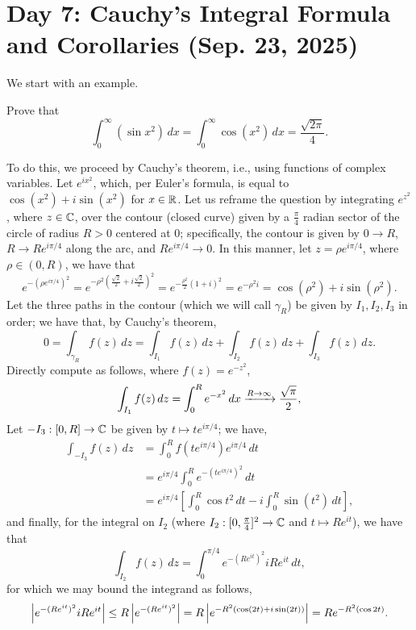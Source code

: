 \section{Day 7: Cauchy's Integral Formula and Corollaries (Sep. 23, 2025)}
We start with an example.
\begin{example}
    Prove that
    \[ \int_0^\infty (\sin x^2) \, dx = \int_0^\infty \cos(x^2) \, dx = \frac{\sqrt{2\pi}}{4}. \]
\end{example}
\begin{solution}
    To do this, we proceed by Cauchy's theorem, i.e., using functions of complex variables. Let $e^{ix^2}$, which, per Euler's formula, is equal to $\cos(x^2) + i \sin(x^2)$ for $x \in \mathbb R$. Let us reframe the question by integrating $e^{z^2}$, where $z \in \mathbb C$, over the contour (closed curve) given by a $\frac{\pi}{4}$ radian sector of the circle of radius $R > 0$ centered at $0$; specifically, the contour is given by $0 \to R$, $R \to R e^{i \pi/4}$ along the arc, and $R e^{i \pi/4} \to 0$. In this manner, let $z = \rho e^{i \pi/4}$, where $\rho \in (0, R)$, we have that
    \[ e^{-(\rho e^{i \pi/4})^2} = e^{-\rho^2 \left(\frac{\sqrt{2}}{2} + i \frac{\sqrt{2}}{2}\right)^2} = e^{-\frac{\rho^2}{2} (1 + i)^2} = e^{-\rho^2 i} = \cos(\rho^2) + i \sin(\rho^2). \]
    Let the three paths in the contour (which we will call $\gamma_R$) be given by $I_1, I_2, I_3$ in order; we have that, by Cauchy's theorem,
    \[ 0 = \int_{\gamma_R} f(z) \, dz = \int_{I_1} f(z) \, dz + \int_{I_2} f(z) \, dz + \int_{I_3} f(z) \, dz. \]
    Directly compute as follows, where $f(z) = e^{-z^2}$,
    \[ \int_{I_1} f(z) \, dz = \int_0^R e^{-x^2} \, dx \xrightarrow{R \to \infty} \frac{\sqrt{\pi}}{2}, \]
    Let $-I_3 : [0, R] \to \mathbb C$ be given by $t \mapsto t e^{i\pi/4}$; we have,
    \begin{align*}
        \int_{-I_3} f(z) \, dz &= \int_0^R f\left(te^{i \pi/4}\right) e^{i\pi/4} \, dt \\
        &= e^{i\pi/4} \int_0^R e^{-(te^{i\pi/4})^2} \, dt \\
        &= e^{i\pi/4} \left[\int_0^R \cos t^2 \, dt - i \int_0^R \sin(t^2) \, dt \right],
    \end{align*}
    and finally, for the integral on $I_2$ (where $I_2 : [0, \frac{\pi}{4}]^2 \to \mathbb C$ and $t \mapsto Re^{it}$), we have that
    \[ \int_{I_2} f(z) \, dz = \int_0^{\pi/4} e^{-(Re^{it})^2} i Re^{it} \, dt, \]
    for which we may bound the integrand as follows,
    \[ \left\lvert e^{-(Re^{it})^2} i Re^{it} \right\rvert \leq R \left\lvert e^{-(Re^{it})^2} \right\rvert = R \left\lvert e^{-R^2(\cos (2t) + i \sin(2t))} \right\rvert = Re^{-R^2(\cos 2t)}. \]

\end{solution}
